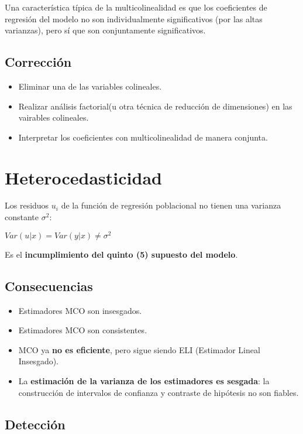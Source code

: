 \documentclass[10pt, a4paper, landscape]{extarticle}
\begin{document}
\begin{multicols}{3}
Una característica típica de la multicolinealidad es que los coeficientes de regresión del modelo no son individualmente significativos (por las altas varianzas), pero sí que son conjuntamente significativos.

\subsection*{Corrección}

\begin{itemize}[leftmargin=*]
\item Eliminar una de las variables colineales.
\item Realizar análisis factorial(u otra técnica de reducción de dimensiones) en las vairables colineales.
\item Interpretar los coeficientes con multicolinealidad de manera conjunta.
\end{itemize}

\columnbreak

\section*{Heterocedasticidad}

Los residuos $u_i$ de la función de regresión poblacional no tienen una varianza constante $\sigma^2$:

\begin{center}
$Var(u|x) = Var(y|x) \neq \sigma^2$
\end{center}

Es el \textbf{incumplimiento del quinto (5) supuesto del modelo}.

\subsection*{Consecuencias}

\begin{itemize}[leftmargin=*]
\item Estimadores MCO son insesgados.
\item Estimadores MCO son consistentes.
\item MCO ya \textbf{no es eficiente}, pero sigue siendo ELI (Estimador Lineal Insesgado).
\item La \textbf{estimación de la varianza de los estimadores es sesgada}: la construcción de intervalos de confianza y contraste de hipótesis no son fiables.
\end{itemize}

\subsection*{Detección}


\end{multicols}
\end{document}
